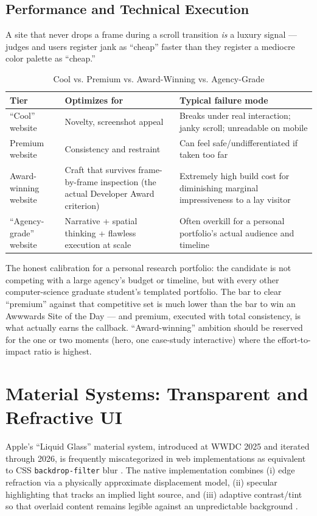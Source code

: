 \documentclass[conference]{IEEEtran}
\begin{document}
\subsection{Performance and Technical Execution}
A site that never drops a frame during a scroll transition \emph{is} a luxury signal --- judges and users register jank as ``cheap'' faster than they register a mediocre color palette as ``cheap.''

\begin{table}[h]
\centering
\caption{Cool vs. Premium vs. Award-Winning vs. Agency-Grade}
\label{tab:tiers_full}
\begin{tabular}{L{1.5cm}L{2.3cm}L{2.5cm}}
\toprule
\textbf{Tier} & \textbf{Optimizes for} & \textbf{Typical failure mode} \\
\midrule
``Cool'' website & Novelty, screenshot appeal & Breaks under real interaction; janky scroll; unreadable on mobile \\
Premium website & Consistency and restraint & Can feel safe/undifferentiated if taken too far \\
Award-winning website & Craft that survives frame-by-frame inspection (the actual Developer Award criterion) & Extremely high build cost for diminishing marginal impressiveness to a lay visitor \\
``Agency-grade'' website & Narrative + spatial thinking + flawless execution at scale & Often overkill for a personal portfolio's actual audience and timeline \\
\bottomrule
\end{tabular}
\end{table}

The honest calibration for a personal research portfolio: the candidate is not competing with a large agency's budget or timeline, but with every other computer-science graduate student's templated portfolio. The bar to clear ``premium'' against that competitive set is much lower than the bar to win an Awwwards Site of the Day --- and premium, executed with total consistency, is what actually earns the callback. ``Award-winning'' ambition should be reserved for the one or two moments (hero, one case-study interactive) where the effort-to-impact ratio is highest.

\section{Material Systems: Transparent and Refractive UI}

Apple's ``Liquid Glass'' material system, introduced at WWDC 2025 and iterated through 2026, is frequently miscategorized in web implementations as equivalent to CSS \texttt{backdrop-filter} blur \cite{apple_liquidglass}. The native implementation combines (i) edge refraction via a physically approximate displacement model, (ii) specular highlighting that tracks an implied light source, and (iii) adaptive contrast/tint so that overlaid content remains legible against an unpredictable background \cite{css_tricks_glass}.
\end{document}
